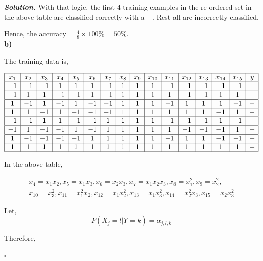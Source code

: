 \documentclass[8pt]{article}
\newenvironment{solution}[1][\it{Solution}]{\textbf{#1. } }{$\square$}
\begin{document}
\begin{solution}
With that logic, the first 4 training examples in the re-ordered set in the above table are classified correctly with a $-$. Rest all are incorrectly classified.

Hence, the accuracy = $\frac{4}{8} \times 100 \% = 50 \%$.
\\

\textbf{b)}

The training data is,


$$
\begin{array}{|c|c|c|c|c|c|c|c|c|c|c|c|c|c|c|c|}
\hline x_{1} & x_{2} & x_{3} & x_{4} & x_{5} & x_{6} & x_{7} & x_{8} & x_{9} & x_{10} & x_{11} & x_{12} & x_{13} & x_{14} & x_{15} & y \\
\hline-1 & -1 & -1 & 1 & 1 & 1 & -1 & 1 & 1 & 1 & -1 & -1 & -1 & -1 & -1 & - \\
\hline-1 & 1 & 1 & -1 & -1 & 1 & -1 & 1 & 1 & 1 & 1 & -1 & -1 & 1 & 1 & - \\
\hline 1 & -1 & 1 & -1 & 1 & -1 & -1 & 1 & 1 & 1 & -1 & 1 & 1 & 1 & -1 & - \\
\hline 1 & 1 & -1 & 1 & -1 & -1 & -1 & 1 & 1 & 1 & 1 & 1 & 1 & -1 & 1 & - \\
\hline-1 & -1 & 1 & 1 & -1 & -1 & 1 & 1 & 1 & 1 & -1 & -1 & -1 & 1 & -1 & + \\
\hline-1 & 1 & -1 & -1 & 1 & -1 & 1 & 1 & 1 & 1 & 1 & -1 & -1 & -1 & 1 & + \\
\hline 1 & -1 & -1 & -1 & -1 & 1 & 1 & 1 & 1 & 1 & -1 & 1 & 1 & -1 & -1 & + \\
\hline 1 & 1 & 1 & 1 & 1 & 1 & 1 & 1 & 1 & 1 & 1 & 1 & 1 & 1 & 1 & + \\
\hline
\end{array}
$$

In the above table,

$$
\begin{aligned}
x_4 = x_{1} x_{2}, x_5 = x_{1} x_{3}, x_6 = x_{2} x_{3}, x_7 = x_{1} x_{2} x_{3}, x_8 = x_{1}^{2}, x_9 = x_{2}^{2},\\
x_{10} = x_{3}^{2}, x_{11} = x_{1}^{2} x_{2}, x_{12} = x_{1} x_{2}^{2}, x_{13} = x_{1} x_{3}^{2}, x_{14} = x_{2}^{2} x_{3}, x_{15} = x_{2} x_{3}^{2}
\end{aligned}
$$

Let, $$P(X_{j} = l | Y = k) = \alpha_{j,l,k}$$

Therefore,


\end{solution}
\end{document}

